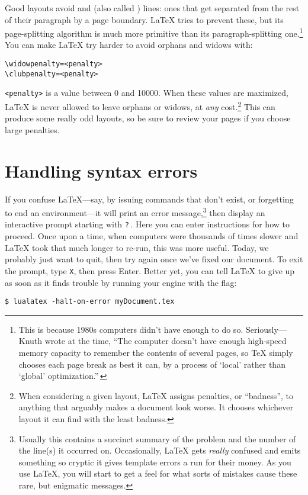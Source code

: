 Good layouts avoid  and 
(also called ) lines:
ones that get separated from the rest of their paragraph by a page boundary.
\LaTeX{} tries to prevent these, but its page-splitting algorithm
is much more primitive than its paragraph-splitting one.\punckern\footnote{%
This is because 1980s computers didn't have enough  to do so.
Seriously---Knuth wrote at the time,
``The computer doesn't have enough high-speed memory capacity to remember the
contents of several pages,
so \TeX{} simply chooses each page break as best it can, by a process of
`local' rather than `global' optimization.\quotekern''\,}
You can make \LaTeX{} try harder to avoid orphans and widows with:
\begin{leftfigure}
\begin{lstlisting}
\widowpenalty=<penalty>
\clubpenalty=<penalty>
\end{lstlisting}
\end{leftfigure}
\verb|<penalty>| is a value between 0 and 10000.
When these values are maximized,
\LaTeX{} is never allowed to leave orphans or widows,
at \emph{any} cost.\punckern\footnote{When considering a given layout,
\LaTeX{} assigns penalties, or ``badness''\quotekern,
to anything that arguably makes a document look worse.
It chooses whichever layout it can find with the least badness.}
This can produce some really odd layouts,
so be sure to review your pages if you choose large penalties.

\section{Handling syntax errors}
If you confuse \LaTeX{}---say, by issuing commands that don't exist,
or forgetting to end an environment---it will print an
error message,\punckern\footnote{Usually this contains a succinct summary of
the problem and the number of the line(s) it occurred on. Occasionally,
\LaTeX{} gets \emph{really} confused and emits something so cryptic it gives
\cpp{} template errors a run for their money.
As you use \LaTeX, you will start to get a feel for what sorts of
mistakes cause these rare, but enigmatic messages.}
then display an interactive prompt starting with \texttt{?}\,.
Here you can enter instructions for how to proceed.
Once upon a time, when computers were thousands of times slower and
\LaTeX{} took that much longer to re-run, this was more useful.
Today, we probably just want to quit,
then try again once we've fixed our document.
To exit the prompt, type \texttt{X}, then press Enter.
Better yet, you can tell \LaTeX{} to give up as soon as it finds trouble
by running your engine with the  flag:
\begin{leftfigure}
\begin{lstlisting}
$ lualatex -halt-on-error myDocument.tex
\end{lstlisting}
\end{leftfigure}
